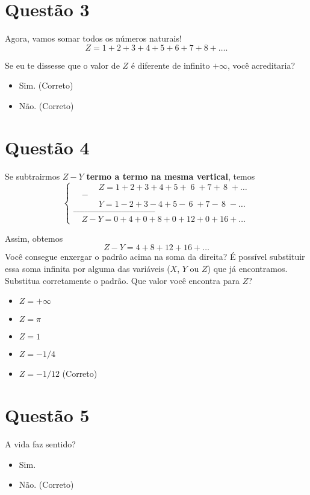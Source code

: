 \documentclass[a4paper,fleqn,12pt]{article}
\begin{document}
\section{Questão 3}

Agora, vamos somar todos os números naturais!
$$
Z = 1 + 2 + 3 + 4 + 5 + 6 + 7 + 8 + \ldots.
$$

Se eu te dissesse que o valor de \(Z\) é diferente de infinito \(+\infty\), você acreditaria?
\begin{itemize}
\item Sim. (Correto)
\item Não. (Correto)
\end{itemize}

\section{Questão 4}

Se subtrairmos \(Z - Y\) \textbf{termo a termo na mesma vertical}, temos
$$
\begin{cases}
\quad \quad \quad Z = 1 + 2 + 3 + 4 + 5 + \; 6 \; + 7 + \, 8 \; + \ldots \\
\quad - \\
\quad \quad \quad Y = 1 - 2 + 3 - 4 + 5 - \, 6 \; + 7 - \, 8 \; - \ldots \\
\_\_\_\_\_\_\_\_\_\_\_\_\_\_\_\_\_\_\_\_\_\_\_\_\_\_\_\_\_ \\
\quad Z-Y = 0 + 4 + 0 + 8 + 0 + 12 + 0 + 16 + \ldots
\end{cases}
$$

Assim, obtemos
$$
Z - Y = 4 + 8 + 12 + 16 + \ldots
$$
Você consegue enxergar o padrão acima na soma da direita? É possível substituir essa soma infinita por alguma das variáveis (\(X\), \(Y\) ou \(Z\)) que já encontramos. Substitua corretamente o padrão. Que valor você encontra para \(Z\)?
\begin{itemize}
\item \(Z = +\infty\)
\item \(Z = \pi\)
\item \(Z = 1\)
\item \(Z = -1/4\)
\item \(Z = -1/12\) (Correto)
\end{itemize}

\section{Questão 5}

A vida faz sentido?
\begin{itemize}
\item Sim.
\item Não. (Correto)
\end{itemize}
\end{document}
